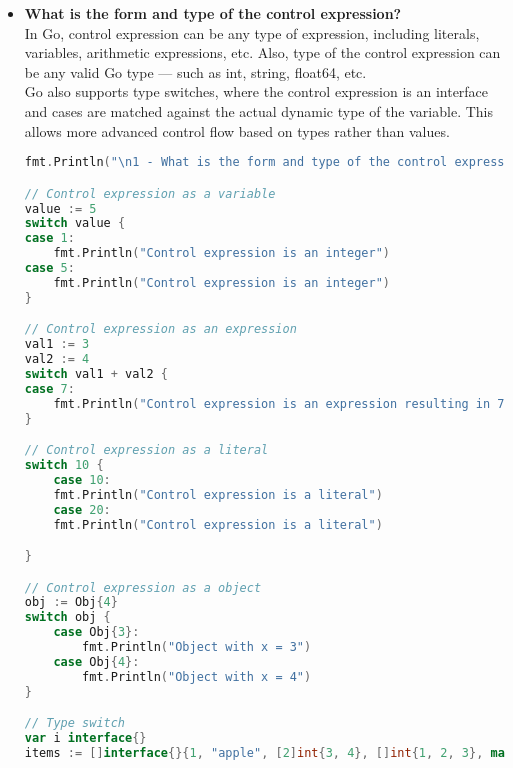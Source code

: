 \documentclass{article}
\begin{document}
\begin{itemize}
\item \textbf{What is the form and type of the control expression?} \\
In Go, control expression can be any type of expression, including literals, variables, arithmetic expressions, etc. Also, type of the control expression can be any valid Go type — such as int, string, float64, etc. \\
Go also supports type switches, where the control expression is an interface and cases are matched against the actual dynamic type of the variable. This allows more advanced control flow based on types rather than values.
\begin{lstlisting}[language=Go]
fmt.Println("\n1 - What is the form and type of the control expression?")

// Control expression as a variable
value := 5
switch value {
case 1:
    fmt.Println("Control expression is an integer")
case 5:
    fmt.Println("Control expression is an integer")
}

// Control expression as an expression
val1 := 3
val2 := 4
switch val1 + val2 {
case 7:
    fmt.Println("Control expression is an expression resulting in 7")
}

// Control expression as a literal
switch 10 {
    case 10:
    fmt.Println("Control expression is a literal")
    case 20:
    fmt.Println("Control expression is a literal")

}

// Control expression as a object
obj := Obj{4}
switch obj {
    case Obj{3}:
        fmt.Println("Object with x = 3")
    case Obj{4}:
        fmt.Println("Object with x = 4")
}

// Type switch
var i interface{}
items := []interface{}{1, "apple", [2]int{3, 4}, []int{1, 2, 3}, map[string]int{"key": 1}, true, nil, Obj{3}}


\end{lstlisting}
\end{itemize}
\end{document}
